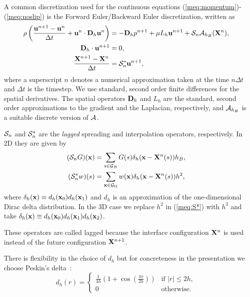 A common discretization used for the continuous equations (\ref{meq:momentum})-(\ref{meq:noslip}) is the Forward Euler/Backward Euler discretization, written as
\begin{align}
\rho\left(\frac{\mathbf{u}^{n+1}-\mathbf{u}^n}{\Delta t} + \mathbf{u}^n\cdot\mathbf{D}_h\mathbf{u}^n\right) &= -\mathbf{D}_h p^{n+1}+ \mu L_h \mathbf{u}^{n+1} + \mathcal{S}_n\mathcal{A}_{h_B}(\mathbf{X}^{n}), \label{meq:FEBE_moment} \\
\mathbf{D}_h \cdot \mathbf{u}^{n+1} &= 0, \label{meq:FEBE_divergence} \\
\frac{\mathbf{X}^{n+1}-\mathbf{X}^n}{\Delta t} &= \mathcal{S}^*_n\mathbf{u}^{n+1}, \label{meq:FEBE_Xt}
\end{align}
where a superscript $n$ denotes a numerical approximation taken at the time $n \Delta t$ and $\Delta t$ is the timestep. We use standard,  second order finite differences for the spatial derivatives. The spatial operators $\mathbf{D}_h$ and $L_h$ are the standard,  second order approximations to the gradient and the Laplacian, respectively, and $\mathcal{A}_{h_B}$ is a suitable discrete version of $\mathcal{A}$.

$\mathcal{S}_n$ and $ \mathcal{S}^*_n$ are the  {\em lagged} spreading and interpolation operators, respectively. In 2D they are given by
\begin{align}
(\mathcal{S}_n G) (\mathbf{x})&= \sum_{s \in \mathcal{G}_B }G(s) \delta_h(\mathbf{x}-\mathbf{X}^n(s))h_B,
\label{meq:S} \\
(\mathcal{S}^*_n w)(s) &= \sum_{ \mathbf{x} \in \mathcal{G}_\Omega} w(\mathbf{x})\delta_h(\mathbf{x}-\mathbf{X}^n(s))h^2,
\label{meq:S*}
\end{align}
where $\delta_h(\mathbf{x}) \equiv d_h(\mathbf{x}_0)d_h(\mathbf{x}_1)$ and $d_h$ is an approximation of the one-dimensional Dirac delta distribution. In the 3D case we replace $h^2$ in (\ref{meq:S*}) with $h^3$ and take $\delta_h(\mathbf{x}) \equiv d_h(\mathbf{x}_0)d_h(\mathbf{x}_1)d_h(\mathbf{x}_2)$.

These operators are called lagged because the interface configuration $\mathbf{X}^n$ is used 
instead of the future configuration $\mathbf{X}^{n+1}$. 

There is flexibility in the choice of $d_h$ but for concreteness in the presentation we choose Peskin's 
delta~\cite{Peskin77}:
\begin{equation}
d_h(r) = \begin{cases}
\frac{1}{4h}\left( 1+\cos(\frac{\pi r}{2h})\right)& \textrm{if } |r|\leq 2h, \\
0& \textrm{otherwise}.
\end{cases}
\end{equation}


